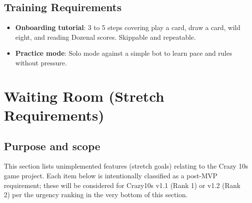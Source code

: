 \documentclass[12pt]{article}
\begin{document}
\subsection{Training Requirements}
\begin{itemize}
  \item \textbf{Onboarding tutorial}: 3 to 5 steps covering play a card, draw a card, wild eight, and reading Dozenal scores. Skippable and repeatable.
  \item \textbf{Practice mode}: Solo mode against a simple bot to learn pace and rules without pressure.
\end{itemize}



\section{Waiting Room (Stretch Requirements)}

\subsection{Purpose and scope}
This section lists unimplemented features (stretch goals) relating to the Crazy 10s game project. Each item below is intentionally classified as a post-MVP requirement; these will be considered for Crazy10s v1.1 (Rank 1) or v1.2 (Rank 2) per the urgency ranking in the very bottom of this section.
\end{document}

